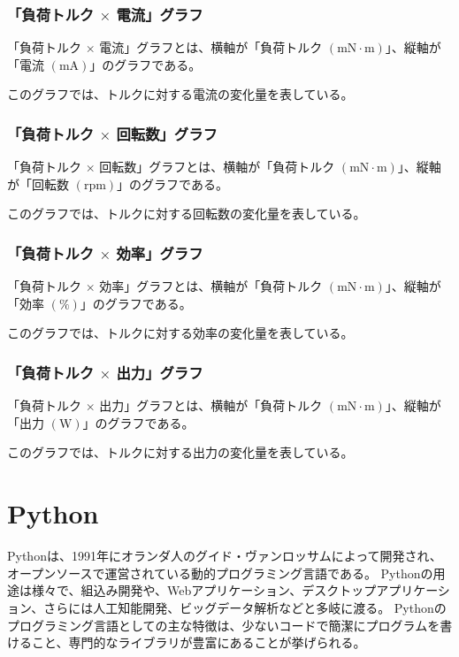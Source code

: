 \subsubsection{「負荷トルク $\times$ 電流」グラフ}\label{sub:sub:torden}
「負荷トルク $\times$ 電流」グラフとは、横軸が「負荷トルク $(\mathrm{mN \cdot m})$」、縦軸が「電流 $(\mathrm{mA})$」のグラフである。

このグラフでは、トルクに対する電流の変化量を表している。
\subsubsection{「負荷トルク $\times$ 回転数」グラフ}\label{sub:sub:torkaiten}
「負荷トルク $\times$ 回転数」グラフとは、横軸が「負荷トルク $(\mathrm{mN \cdot m})$」、縦軸が「回転数 $(\mathrm{rpm})$」のグラフである。

このグラフでは、トルクに対する回転数の変化量を表している。
\subsubsection{「負荷トルク $\times$ 効率」グラフ}\label{sub:sub:torkouritu}
「負荷トルク $\times$ 効率」グラフとは、横軸が「負荷トルク $(\mathrm{mN \cdot m})$」、縦軸が「効率 $(\mathrm{\%})$」のグラフである。

このグラフでは、トルクに対する効率の変化量を表している。
\subsubsection{「負荷トルク $\times$ 出力」グラフ}\label{sub:sub:torsyutu}
「負荷トルク $\times$ 出力」グラフとは、横軸が「負荷トルク $(\mathrm{mN \cdot m})$」、縦軸が「出力 $(\mathrm{W})$」のグラフである。

このグラフでは、トルクに対する出力の変化量を表している。
  \section{Python}\label{python}
Pythonは、1991年にオランダ人のグイド・ヴァンロッサムによって開発され、オープンソースで運営されている動的プログラミング言語である\cite{pythonoya}。
Pythonの用途は様々で、組込み開発や、Webアプリケーション、デスクトップアプリケーション、さらには人工知能開発、ビッグデータ解析などと多岐に渡る\cite{pythonsamu}。
Pythonのプログラミング言語としての主な特徴は、少ないコードで簡潔にプログラムを書けること、専門的なライブラリが豊富にあることが挙げられる。

